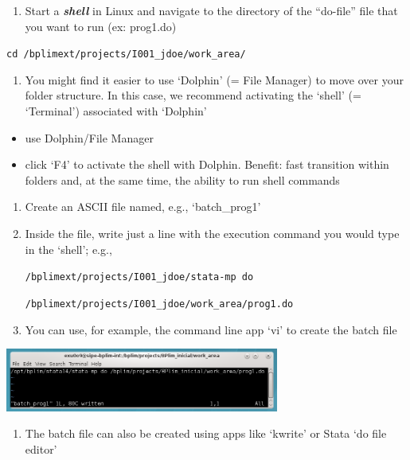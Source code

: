\documentclass[
  11pt,
  a4paper,
]{article}
\providecommand{\tightlist}{%
  \setlength{\itemsep}{0pt}\setlength{\parskip}{0pt}}
\begin{document}
\begin{enumerate}
\def\labelenumi{\arabic{enumi}.}
\tightlist
\item
  Start a \emph{\textquotesingle{}\textbf{shell}\textquotesingle{}} in
  Linux and navigate to the directory of the ``do-file'' file that you
  want to run (ex: prog1.do)
\end{enumerate}

\texttt{cd\ /bplimext/projects/I001\_jdoe/work\_area/}

\begin{enumerate}
\def\labelenumi{\arabic{enumi}.}
\setcounter{enumi}{1}
\tightlist
\item
  You might find it easier to use `Dolphin' (= File Manager) to move
  over your folder structure. In this case, we recommend activating the
  `shell' (= `Terminal') associated with `Dolphin'
\end{enumerate}

\begin{itemize}
\item
  use Dolphin/File Manager
\item
  click `F4' to activate the shell with Dolphin. Benefit: fast
  transition within folders and, at the same time, the ability to run
  shell commands
\end{itemize}

\begin{enumerate}
\def\labelenumi{\arabic{enumi}.}
\setcounter{enumi}{2}
\item
  Create an ASCII file named, e.g., `batch\_prog1'
\item
  Inside the file, write just a line with the execution command you
  would type in the `shell'; e.g.,

  \texttt{/bplimext/projects/I001\_jdoe/stata-mp\ do}

  \texttt{/bplimext/projects/I001\_jdoe/work\_area/prog1.do}
\item
  You can use, for example, the command line app `vi' to create the
  batch file
\end{enumerate}

\includegraphics[width=3.54331in,height=0.81802in]{./media/image14.png}

\begin{enumerate}
\def\labelenumi{\arabic{enumi}.}
\setcounter{enumi}{5}
\tightlist
\item
  The batch file can also be created using apps like `kwrite' or Stata
  `do file editor'
\end{enumerate}
\end{document}
